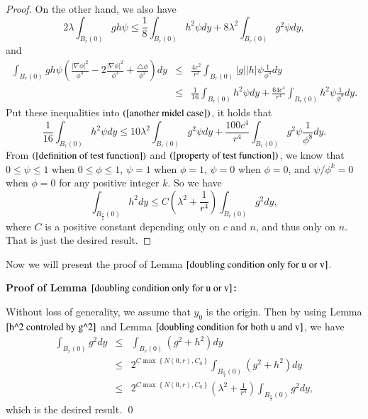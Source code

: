 \documentclass[a4paper, 12pt, onecolumn]{article} \textwidth 148mm
\begin{document}
\begin{proof}
On the other hand, we also have
\begin{equation*}
2\lambda\int_{B_r(0)}gh\psi\leq\frac{1}{8}\int_{B_r(0)}h^2\psi dy
+8\lambda^2\int_{B_r(0)}g^2\psi dy,
\end{equation*}
and
\begin{eqnarray*}
\int_{B_r(0)}gh\psi\left(\frac{|\nabla\phi|^2}{\phi^4}-2\frac{|\nabla\phi|^2}{\phi^3}
+\frac{\triangle\phi}{\phi^2}\right)dy
&\leq&\frac{4c^2}{r^2}\int_{B_r(0)}|g||h|\psi\frac{1}{\phi^4}dy
\\&\leq&
\frac{1}{16}\int_{B_r(0)}h^2\psi dy
+\frac{64c^4}{r^4}\int_{B_r(0)}h^2\psi\frac{1}{\phi^8}dy.
\end{eqnarray*}
Put these inequalities into $(\ref{another midel case})$, it holds that
\begin{equation*}
\frac{1}{16}\int_{B_r(0)}h^2\psi dy\leq10\lambda^2\int_{B_r(0)}g^2\psi dy
+\frac{100c^4}{r^4}\int_{B_r(0)}g^2\psi\frac{1}{\phi^8}dy.
\end{equation*}
From $(\ref{definition of test function})$ and $(\ref{property of test function})$, we know that $0\leq\psi\leq1$ when $0\leq\phi\leq1$, $\psi=1$ when $\phi=1$, $\psi=0$ when $\phi=0$, and $\psi/\phi^k=0$ when $\phi=0$ for any positive integer $k$. So we have
\begin{equation*}
\int_{B_\frac{r}{2}(0)}h^2dy\leq C\left(\lambda^2+\frac{1}{r^4}\right)\int_{B_r(0)}g^2dy,
\end{equation*}
where $C$ is a positive constant depending only on $c$ and $n$, and thus only on $n$. That is just the desired result.
\end{proof}

Now we will present the proof of Lemma $\ref{doubling condition only for u or v}$.

\textbf{Proof of Lemma $\ref{doubling condition only for u or v}$:}

Without loss of generality, we assume that $y_0$ is the origin. Then by using Lemma $\ref{h^2 controled by g^2}$ and Lemma $\ref{doubling condition for both u and v}$, we have
\begin{eqnarray*}
\int_{B_r(0)}g^2dy&\leq&\int_{B_r(0)}(g^2+h^2)dy
\\&\leq&
2^{C\max\left\{N(0,r),C_0\right\}}\int_{B_{\frac{r}{4}}(0)}(g^2+h^2)dy
\\&\leq&2^{C\max\left\{N(0,r),C_0\right\}}\left(\lambda^2+\frac{1}{r^4}\right)\int_{B_{\frac{r}{2}}(0)}g^2dy,
\end{eqnarray*}
which is the desired result. \qed
\end{document}
